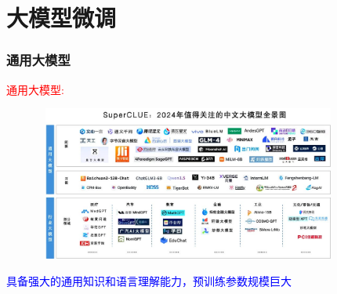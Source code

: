 \small
\section{大模型微调}
\begin{frame}
    \frametitle{通用大模型}
    \textcolor{red}{通用大模型:}~{\fontsize{8.2pt}{6.2pt}}
\begin{figure}[h!]
\vspace*{-0.05in}
\centering
\includegraphics[height=2.0in, width=4.0in, viewport=0 0 1080 510,clip]{Figures/LLM_model-logo_Chinese.jpg}
\label{LLM_model-logo_Chinese}
\end{figure}
\textcolor{blue}{具备强大的通用知识和语言理解能力，预训练参数规模巨大}
\end{frame}

